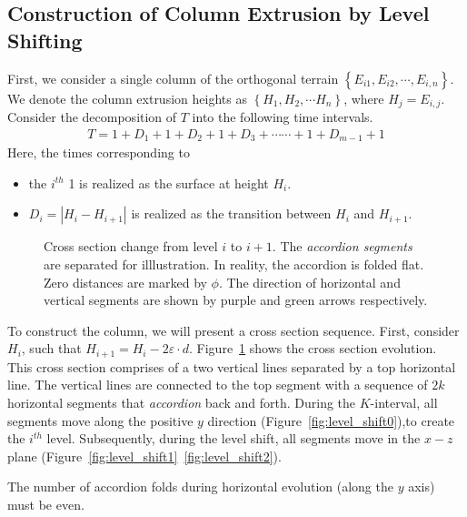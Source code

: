 \subsection{Construction of Column Extrusion by Level Shifting}
\label{sec:column_extrusion}

First, we consider a single column of the orthogonal terrain $\left\{ E_{i1}, E_{i2}, \cdots, E_{i,n} \right\}$.
We denote the column extrusion heights as $\left\{ H_1, H_2,\cdots H_n \right\}$, where $H_j = E_{i,j}$.
Consider the decomposition of $T$ into the following time intervals.%
\begin{align}
    \label{eq:column_decomposition}
T = 1 + D_1  +  1 + D_2  +  1 + D_3  +\cdots\cdots +  1 + D_{m-1}  +  1
\end{align}
Here, the times corresponding to
\begin{itemize}
\item the $i^{th}$ 1 is realized as the surface at height $H_i$.
\item $D_i = \left| H_i-H_{i+1}\right|$ is realized as the transition between $H_i$ and $H_{i+1}$.  \end{itemize}

\graphicspath{{./figures/}}
\begin{figure}[htb]
    \def\svgwidth{1.0\textwidth}
    \caption{
    Cross section change from level $i$ to $i+1$. The \emph{accordion segments} are separated for illlustration.
    In reality, the accordion is folded flat. Zero distances are marked by $\phi$.
    The direction of horizontal and vertical segments are shown by purple and green arrows respectively.
    }
    \label{fig:level_shift_layers}
\end{figure}

%

To construct the column, we will present a cross section sequence.
First, consider $H_i$, such that $H_{i+1} = H_i-2\varepsilon\cdot d$.
Figure~\ref{fig:level_shift_layers} shows the cross section evolution.
This cross section comprises of a two vertical lines separated by a top horizontal line.
The vertical lines are connected to the top segment with
a sequence of $2k$ horizontal segments that \emph{accordion} back and forth.
During the $K$-interval, all segments move along the positive $y$ direction (Figure~\ref{fig:level_shift0}),to create the $i^{th}$ level.
Subsequently, during the level shift, all segments move in the $x-z$ plane (Figure~\ref{fig:level_shift1}~\ref{fig:level_shift2}).
\begin{lemma}
\label{lem:accordion_even}
The number of accordion folds during horizontal evolution (along the $y$ axis) must be even.
\end{lemma}



